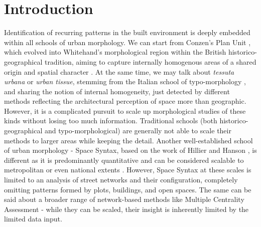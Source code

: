\section{Introduction}
\label{sec:intro}

Identification of recurring patterns in the built environment is deeply embedded within
all schools of urban morphology. We can start from Conzen's Plan Unit \citep{conzen1960},
which evolved into Whitehand's morphological region within the British
historico-geographical tradition, aiming to capture internally homogenous areas of a
shared origin and spatial character \citep{oliveira2020}. At the same time, we may talk
about \textit{tessuta urbana} or \textit{urban tissue}, stemming from the Italian school
of typo-morphology \citep{caniggia2001}, and sharing the notion of internal homogeneity,
just detected by different methods reflecting the architectural perception of space more
than geographic. However, it is a complicated pursuit to scale up morphological studies
of these kinds without losing too much information. Traditional schools (both
historico-geographical and typo-morphological) are generally not able to scale their
methods to larger areas while keeping the detail. Another well-established school of
urban morphology - Space Syntax, based on the work of Hillier and Hanson
\citep{hillier1996}, is different as it is predominantly quantitative and can be considered scalable to metropolitan or even
national extents \citep{spacesyntaxlimited2018}. However, Space Syntax at these scales
is limited to an analysis of street networks and their configuration, completely
omitting patterns formed by plots, buildings, and open spaces. The same can be said
about a broader range of network-based methods like Multiple Centrality Assessment
\citep{porta2010} - while they can be scaled, their insight is inherently limited by the
limited data input.

